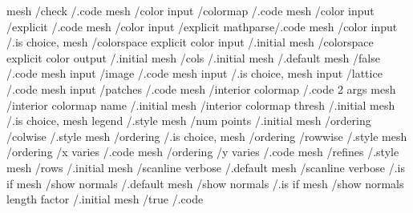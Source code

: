 mesh       /check                                              /.code             
mesh       /color input                     /colormap          /.code
mesh       /color input                     /explicit          /.code
mesh       /color input                     /explicit mathparse/.code
mesh       /color input                                        /.is choice,       
mesh       /colorspace explicit color input                    /.initial          
mesh       /colorspace explicit color output                   /.initial          
mesh       /cols                                               /.initial          
mesh                                                           /.default                        
mesh       /false                                              /.code             
mesh input /image                                              /.code             
mesh input                                                     /.is choice,                     
mesh input /lattice                                            /.code             
mesh input /patches                                            /.code             
mesh       /interior colormap                                  /.code 2 args      
mesh       /interior colormap name                             /.initial          
mesh       /interior colormap thresh                           /.initial          
mesh                                                           /.is choice,                     
mesh legend                                                    /.style                          
mesh       /num points                                         /.initial          
mesh       /ordering                        /colwise           /.style
mesh       /ordering                                           /.is choice,       
mesh       /ordering                        /rowwise           /.style
mesh       /ordering                        /x varies          /.code
mesh       /ordering                        /y varies          /.code
mesh       /refines                                            /.style            
mesh       /rows                                               /.initial          
mesh       /scanline verbose                                   /.default          
mesh       /scanline verbose                                   /.is if            
mesh       /show normals                                       /.default          
mesh       /show normals                                       /.is if            
mesh       /show normals length factor                         /.initial          
mesh       /true                                               /.code             

